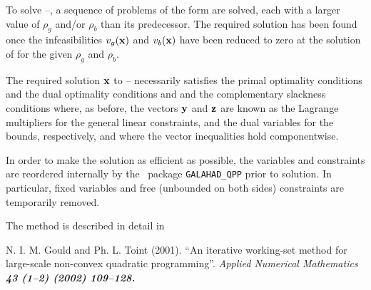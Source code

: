 \documentclass{galahad}
\begin{document}
To solve --, a sequence of problems of the form  are
solved, each with a larger value of $\rho_g$ and/or $\rho_b$ 
than its predecessor. The
required solution has been found once the infeasibilities 
$v_g({\mathbf{x}})$ and $v_b({\mathbf{x}})$ have been reduced to zero at the solution of 
 for the given $\rho_g$ and $\rho_b$.

The required solution ${\mathbf{x}}$ to -- necessarily satisfies 
the primal optimality conditions
\disp{\bmA \bmx = \bmc}
and 
the dual optimality conditions
and 
and the complementary slackness conditions 
where, as before, the vectors ${\mathbf{y}}$ and ${\mathbf{z}}$ are 
known as the Lagrange multipliers for
the general linear constraints, and the dual variables for the bounds,
respectively, and where the vector inequalities hold componentwise.

In order to make the solution as efficient as possible, the 
variables and constraints are reordered internally
by the \galahad\ package {\tt GALAHAD\_QPP} prior to solution. 
In particular, fixed variables and 
free (unbounded on both sides) constraints are temporarily removed.

\vspace*{1mm}

\galreferences
\vspace*{1mm}

\noindent
The method is described in detail in
\vspace*{1mm}

\noindent
N. I. M. Gould and Ph. L. Toint (2001).
``An iterative working-set method 
for large-scale non-convex quadratic programming''.
\em Applied Numerical Mathematics
\bf 43 (1--2) \rm (2002) 109--128.

\end{document}

